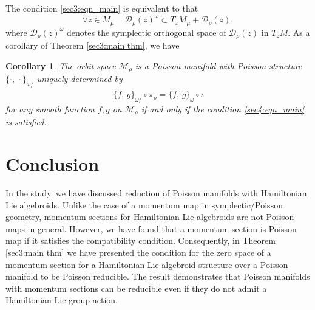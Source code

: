 \documentclass[a4paper,11pt,dvipdfmx]{article}
\newtheorem{cor}[thm]{Corollary}
\numberwithin{equation}{section}
\begin{document}
The condition \eqref{sec3:eqn_main} is equivalent to that 
\begin{equation}\label{sec4:eqn_main}
\forall z\in M_{\mu}\ \quad \mathcal{D}_{\rho}(z)^{\omega}\subset T_zM_{\mu} + \mathcal{D}_{\rho}(z),
\end{equation}
where $\mathcal{D}_{\rho}(z)^{\omega}$ denotes the symplectic orthogonal space of $\mathcal{D}_{\rho}(z)$ in $T_zM$. 
As a corollary of Theorem \ref{sec3:main thm}, we have 

\begin{cor}
The orbit space $\mathcal{M}_{\rho}$ is a Poisson manifold with Poisson structure $\{\cdot,\,\cdot\}_{\omega/}$ uniquely determined by  
\begin{equation*}
 \{f,\,g\}_{\omega/}\circ\pi_{\rho} = \{\tilde{f},\,\tilde{g}\}_{\omega}\circ\iota 
\end{equation*}
for any smooth function $f,g$ on $\mathcal{M}_{\rho}$ if and only if the condition \eqref{sec4:eqn_main} is satisfied. 
\end{cor}

\section{Conclusion}
In the study, we have discussed reduction of Poisson manifolds with Hamiltonian Lie algebroids. 
Unlike the case of a momentum map in symplectic/Poisson geometry, momentum sections for Hamiltonian Lie algebroids are not Poisson maps in general. 
However, we have found that a momentum section is Poisson map if it satisfies the compatibility condition. 
Consequently, in Theorem \ref{sec3:main thm} we have presented the condition 
for the zero space of a momentum section for a Hamiltonian Lie algebroid structure over a Poisson manifold to be Poisson reducible. 
The result demonstrates that Poisson manifolds with momentum sections can be reducible even if they do not admit a Hamiltonian Lie group action. 
\end{document}
